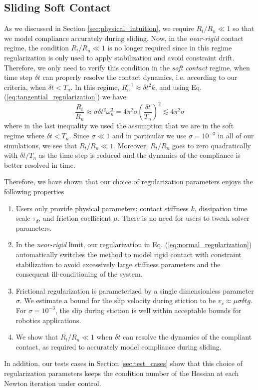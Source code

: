 \subsection{Sliding Soft Contact}

As we discussed in Section \ref{sec:physical_intuition}, we require $R_t/R_n\ll
1$ so that we model compliance accurately during sliding. Now, in the
\emph{near-rigid} contact regime, the condition $R_t/R_n\ll 1$ is no longer
required since in this regime regularization is only used to apply stabilization
and avoid constraint drift. Therefore, we only need to verify this condition in
the \emph{soft contact} regime, when time step $\delta t$ can properly resolve
the contact dynamics, i.e. according to our criteria, when $\delta t < T_n$. In
this regime, $R_n^{-1}\approx \delta t^2k$, and using Eq.
(\ref{eq:tangential_regularization}) we have
\begin{equation*}
    \frac{R_t}{R_n}\approx \sigma \delta t^2 \omega_n^2=4\pi^2\sigma\left(\frac{\delta t}{T_n}\right)^2
    \lesssim 4\pi^2\sigma
\end{equation*}
where in the last inequality we used the assumption that we are in the soft
regime where $\delta t < T_n$. Since $\sigma \ll 1$ and in particular we
use $\sigma=10^{-3}$ in all of our simulations, we see that $R_t/R_n \ll
1$. Moreover, $R_t/R_n$ goes to zero quadratically with $\delta t/T_n$ as
the time step is reduced and the dynamics of the compliance is better resolved
in time.

Therefore, we have shown that our choice of regularization parameters enjoys the
following properties
\begin{enumerate}
    \item Users only provide physical parameters; contact stiffness $k$, dissipation time scale
    $\tau_d$, and friction coefficient $\mu$. There is no need for users to tweak
    solver parameters.
    \item In the \emph{near-rigid} limit, our regularization in
    Eq. (\ref{eq:normal_regularization}) automatically switches the method to
    model rigid contact with constraint stabilization to avoid excessively large
    stiffness parameters and the consequent ill-conditioning of the system.
    \item Frictional regularization is parameterized by a single dimensionless
    parameter $\sigma$. We estimate a bound for the slip velocity during
    stiction to be $v_s \approx \mu \sigma \delta t g$. For
    $\sigma=10^{-3}$, the slip during stiction is well within acceptable
    bounds for robotics applications.
    \item We show that $R_t/R_n \ll 1$ when $\delta t$ can resolve the dynamics
    of the compliant contact, as required to accurately model compliance during
    sliding.
\end{enumerate}

In addition, our tests cases in Section \ref{sec:test_cases} show that this
choice of regularization parameters keeps the condition number of the Hessian at
each Newton iteration under control.
